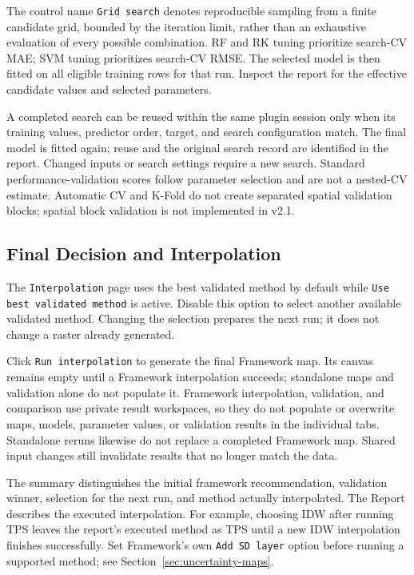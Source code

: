 \documentclass[11pt,a4paper]{article}
\begin{document}
The control name \texttt{Grid search} denotes reproducible sampling from a finite candidate grid, bounded by the iteration limit, rather than an exhaustive evaluation of every possible combination. RF and RK tuning prioritize search-CV MAE; SVM tuning prioritizes search-CV RMSE. The selected model is then fitted on all eligible training rows for that run. Inspect the report for the effective candidate values and selected parameters.

A completed search can be reused within the same plugin session only when its training values, predictor order, target, and search configuration match. The final model is fitted again; reuse and the original search record are identified in the report. Changed inputs or search settings require a new search. Standard performance-validation scores follow parameter selection and are not a nested-CV estimate. Automatic CV and K-Fold do not create separated spatial validation blocks; spatial block validation is not implemented in v2.1.

\subsection{Final Decision and Interpolation}

The \texttt{Interpolation} page uses the best validated method by default while \texttt{Use best validated method} is active. Disable this option to select another available validated method. Changing the selection prepares the next run; it does not change a raster already generated.

Click \texttt{Run interpolation} to generate the final Framework map. Its canvas remains empty until a Framework interpolation succeeds; standalone maps and validation alone do not populate it. Framework interpolation, validation, and comparison use private result workspaces, so they do not populate or overwrite maps, models, parameter values, or validation results in the individual tabs. Standalone reruns likewise do not replace a completed Framework map. Shared input changes still invalidate results that no longer match the data.

The summary distinguishes the initial framework recommendation, validation winner, selection for the next run, and method actually interpolated. The Report describes the executed interpolation. For example, choosing IDW after running TPS leaves the report's executed method as TPS until a new IDW interpolation finishes successfully. Set Framework's own \texttt{Add SD layer} option before running a supported method; see Section~\ref{sec:uncertainty-maps}.
\end{document}
